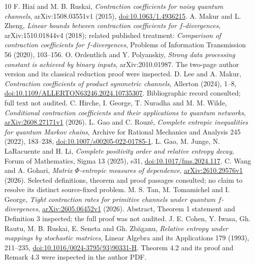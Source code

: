 \documentclass[11pt]{article}
\theoremstyle{remark}\newtheorem{remark}[theorem]{Remark}
\begin{document}
\clearpage
\begin{thebibliography}{10}
 F. Hiai and M. B. Ruskai, \emph{Contraction coefficients for noisy quantum channels}, arXiv:1508.03551v1 (2015), \href{https://doi.org/10.1063/1.4936215}{doi:10.1063/1.4936215}.
 A. Makur and L. Zheng, \emph{Linear bounds between contraction coefficients for $f$-divergences}, arXiv:1510.01844v4 (2018); related published treatment: \emph{Comparison of contraction coefficients for $f$-divergences}, Problems of Information Transmission 56 (2020), 103--156.
 O. Ordentlich and Y. Polyanskiy, \emph{Strong data processing constant is achieved by binary inputs}, arXiv:2010.01987. The two-page author version and its classical reduction proof were inspected.
 D. Lee and A. Makur, \emph{Contraction coefficients of product symmetric channels}, Allerton (2024), 1--8, \href{https://doi.org/10.1109/ALLERTON63246.2024.10735307}{doi:10.1109/ALLERTON63246.2024.10735307}. Bibliographic record consulted; full text not audited.
 C. Hirche, I. George, T. Nuradha and M. M. Wilde, \emph{Conditional contraction coefficients and their applications to quantum networks}, \href{https://arxiv.org/abs/2608.27171v1}{arXiv:2608.27171v1} (2026).
 L. Gao and C. Rouz\'e, \emph{Complete entropic inequalities for quantum Markov chains}, Archive for Rational Mechanics and Analysis 245 (2022), 183--238, \href{https://doi.org/10.1007/s00205-022-01785-1}{doi:10.1007/s00205-022-01785-1}.
 L. Gao, M. Junge, N. LaRacuente and H. Li, \emph{Complete positivity order and relative entropy decay}, Forum of Mathematics, Sigma 13 (2025), e31, \href{https://doi.org/10.1017/fms.2024.117}{doi:10.1017/fms.2024.117}.
 C. Wang and A. Gohari, \emph{Matrix $\Phi$-entropic measures of dependence}, \href{https://arxiv.org/abs/2610.29576v1}{arXiv:2610.29576v1} (2026). Selected definitions, theorem and proof passages consulted; no claim to resolve its distinct source-fixed problem.
 M. S. Tan, M. Tomamichel and I. George, \emph{Tight contraction rates for primitive channels under quantum $f$-divergences}, \href{https://arxiv.org/abs/2605.06452v1}{arXiv:2605.06452v1} (2026). Abstract, Theorem 1 statement and Definition 3 inspected; the full proof was not audited.
 J. E. Cohen, Y. Iwasa, Gh. Rautu, M. B. Ruskai, E. Seneta and Gh. Zb\u aganu, \emph{Relative entropy under mappings by stochastic matrices}, Linear Algebra and its Applications 179 (1993), 211--235, \href{https://doi.org/10.1016/0024-3795(93)90331-H}{doi:10.1016/0024-3795(93)90331-H}. Theorem 4.2 and its proof and Remark 4.3 were inspected in the author PDF.
\end{thebibliography}
\end{document}
